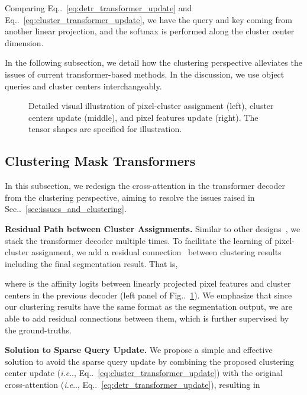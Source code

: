 \documentclass[10pt,twocolumn,letterpaper]{article}
\makeatletter
\DeclareRobustCommand\onedot{\futurelet\@let@token\@onedot}
\def\@onedot{\ifx\@let@token.\else.\null\fi\xspace}
\def\ie{\emph{i.e}\onedot} \def\Ie{\emph{I.e}\onedot}
\newcommand{\figref}[1]{Fig\onedot~\ref{#1}}
\newcommand{\equref}[1]{Eq\onedot~\eqref{#1}}
\newcommand{\secref}[1]{Sec\onedot~\ref{#1}}
\makeatother
\begin{document}
Comparing \equref{eq:detr_transformer_update} and \equref{eq:cluster_transformer_update}, we have the query  and key  coming from another linear projection, and the softmax is performed along the cluster center dimension.

In the following subsection, we detail how the clustering perspective alleviates the issues of current transformer-based methods. In the discussion, we use object queries and cluster centers interchangeably.

\begin{figure}[tb]
    \centering
    \caption{Detailed visual illustration of pixel-cluster assignment (left), cluster centers update (middle), and pixel features update (right). The tensor shapes are specified for illustration.}
    \label{fig:detailed_clusteringattn}
\end{figure}


\subsection{Clustering Mask Transformers}
In this subsection, we redesign the cross-attention in the transformer decoder from the clustering perspective, aiming to resolve the issues raised in \secref{sec:issues_and_clustering}.

\vspace{0.5ex}
\noindent\textbf{Residual Path between Cluster Assignments.} Similar to other designs~\cite{carion2020end}, we stack the transformer decoder multiple times. To facilitate the learning of pixel-cluster assignment, we add a residual connection~\cite{he2016deep} between clustering results including the final segmentation result. That is,


where  is the affinity logits between linearly projected pixel features and cluster centers in the previous decoder (left panel of \figref{fig:detailed_clusteringattn}). We emphasize that since our clustering results have the same format as the segmentation output, we are able to add residual connections between them, which is further supervised by the ground-truths.

\vspace{0.5ex}
\noindent\textbf{Solution to Sparse Query Update.} We propose a simple and effective solution to avoid the sparse query update by combining the proposed clustering center update (\ie, \equref{eq:cluster_transformer_update}) with the original cross-attention (\ie, \equref{eq:detr_transformer_update}), resulting in
\end{document}
